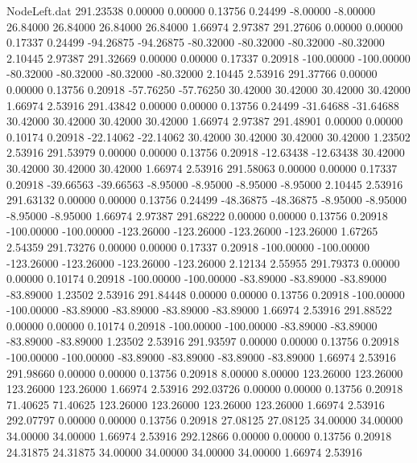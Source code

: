 \begin{filecontents}{NodeLeft.dat}
 291.23538    0.00000    0.00000     0.13756    0.24499   -8.00000   -8.00000   26.84000   26.84000   26.84000   26.84000    1.66974    2.97387
 291.27606    0.00000    0.00000     0.17337    0.24499  -94.26875  -94.26875  -80.32000  -80.32000  -80.32000  -80.32000    2.10445    2.97387
 291.32669    0.00000    0.00000     0.17337    0.20918 -100.00000 -100.00000  -80.32000  -80.32000  -80.32000  -80.32000    2.10445    2.53916
 291.37766    0.00000    0.00000     0.13756    0.20918  -57.76250  -57.76250   30.42000   30.42000   30.42000   30.42000    1.66974    2.53916
 291.43842    0.00000    0.00000     0.13756    0.24499  -31.64688  -31.64688   30.42000   30.42000   30.42000   30.42000    1.66974    2.97387
 291.48901    0.00000    0.00000     0.10174    0.20918  -22.14062  -22.14062   30.42000   30.42000   30.42000   30.42000    1.23502    2.53916
 291.53979    0.00000    0.00000     0.13756    0.20918  -12.63438  -12.63438   30.42000   30.42000   30.42000   30.42000    1.66974    2.53916
 291.58063    0.00000    0.00000     0.17337    0.20918  -39.66563  -39.66563   -8.95000   -8.95000   -8.95000   -8.95000    2.10445    2.53916
 291.63132    0.00000    0.00000     0.13756    0.24499  -48.36875  -48.36875   -8.95000   -8.95000   -8.95000   -8.95000    1.66974    2.97387
 291.68222    0.00000    0.00000     0.13756    0.20918 -100.00000 -100.00000 -123.26000 -123.26000 -123.26000 -123.26000    1.67265    2.54359
 291.73276    0.00000    0.00000     0.17337    0.20918 -100.00000 -100.00000 -123.26000 -123.26000 -123.26000 -123.26000    2.12134    2.55955
 291.79373    0.00000    0.00000     0.10174    0.20918 -100.00000 -100.00000  -83.89000  -83.89000  -83.89000  -83.89000    1.23502    2.53916
 291.84448    0.00000    0.00000     0.13756    0.20918 -100.00000 -100.00000  -83.89000  -83.89000  -83.89000  -83.89000    1.66974    2.53916
 291.88522    0.00000    0.00000     0.10174    0.20918 -100.00000 -100.00000  -83.89000  -83.89000  -83.89000  -83.89000    1.23502    2.53916
 291.93597    0.00000    0.00000     0.13756    0.20918 -100.00000 -100.00000  -83.89000  -83.89000  -83.89000  -83.89000    1.66974    2.53916
 291.98660    0.00000    0.00000     0.13756    0.20918    8.00000    8.00000  123.26000  123.26000  123.26000  123.26000    1.66974    2.53916
 292.03726    0.00000    0.00000     0.13756    0.20918   71.40625   71.40625  123.26000  123.26000  123.26000  123.26000    1.66974    2.53916
 292.07797    0.00000    0.00000     0.13756    0.20918   27.08125   27.08125   34.00000   34.00000   34.00000   34.00000    1.66974    2.53916
 292.12866    0.00000    0.00000     0.13756    0.20918   24.31875   24.31875   34.00000   34.00000   34.00000   34.00000    1.66974    2.53916

\end{filecontents}
